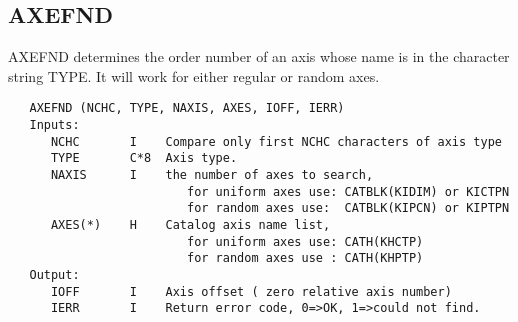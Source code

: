 \subsection{AXEFND}
AXEFND determines the order number of an axis whose name is in the
character string TYPE.  It will work for either regular or random
axes.
\begin{verbatim}
   AXEFND (NCHC, TYPE, NAXIS, AXES, IOFF, IERR)
   Inputs:
      NCHC       I    Compare only first NCHC characters of axis type
      TYPE       C*8  Axis type.
      NAXIS      I    the number of axes to search,
                         for uniform axes use: CATBLK(KIDIM) or KICTPN
                         for random axes use:  CATBLK(KIPCN) or KIPTPN
      AXES(*)    H    Catalog axis name list,
                         for uniform axes use: CATH(KHCTP)
                         for random axes use : CATH(KHPTP)
   Output:
      IOFF       I    Axis offset ( zero relative axis number)
      IERR       I    Return error code, 0=>OK, 1=>could not find.
\end{verbatim}

